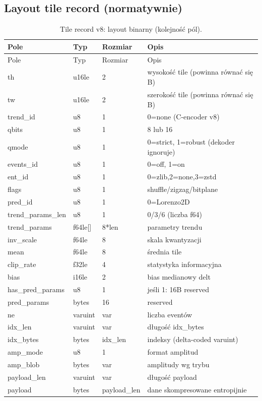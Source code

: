 \documentclass[11pt,a4paper]{article}
\begin{document}
\subsection{Layout tile record (normatywnie)}
\begin{longtable}{@{}llll@{}}
\caption{Tile record v8: layout binarny (kolejność pól).}
\label{tab:tile_layout}\\
\toprule
Pole & Typ & Rozmiar & Opis \\
\midrule
\endfirsthead
\toprule
Pole & Typ & Rozmiar & Opis \\
\midrule
\endhead
\bottomrule
\endfoot

th & u16le & 2 & wysokość tile (powinna równać się B) \\
tw & u16le & 2 & szerokość tile (powinna równać się B) \\
trend\_id & u8 & 1 & 0=none (C-encoder v8) \\
qbits & u8 & 1 & 8 lub 16 \\
qmode & u8 & 1 & 0=strict, 1=robust (dekoder ignoruje) \\
events\_id & u8 & 1 & 0=off, 1=on \\
ent\_id & u8 & 1 & 0=zlib,2=none,3=zstd \\
flags & u8 & 1 & shuffle/zigzag/bitplane \\
pred\_id & u8 & 1 & 0=Lorenzo2D \\
trend\_params\_len & u8 & 1 & 0/3/6 (liczba f64) \\
trend\_params & f64le[] & 8*len & parametry trendu \\
inv\_scale & f64le & 8 & skala kwantyzacji \\
mean & f64le & 8 & średnia tile \\
clip\_rate & f32le & 4 & statystyka informacyjna \\
bias & i16le & 2 & bias medianowy delt \\
has\_pred\_params & u8 & 1 & jeśli 1: 16B reserved \\
pred\_params & bytes & 16 & reserved \\
ne & varuint & var & liczba eventów \\
idx\_len & varuint & var & długość idx\_bytes \\
idx\_bytes & bytes & idx\_len & indeksy (delta-coded varuint) \\
amp\_mode & u8 & 1 & format amplitud \\
amp\_blob & bytes & var & amplitudy wg trybu \\
payload\_len & varuint & var & długość payload \\
payload & bytes & payload\_len & dane skompresowane entropijnie \\
\end{longtable}
\end{document}
